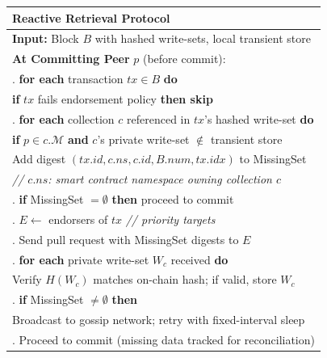 \begin{algorithm}[h]
\centering
\small
\begin{tabular}{|p{}|}
\hline
\textbf{Reactive Retrieval Protocol} \\
\hline
\textbf{Input:} Block $B$ with hashed write-sets, local transient store \\[3pt]
\textbf{At Committing Peer} $p$ (before commit): \\
\quad 1. \textbf{for each} transaction $tx \in B$ \textbf{do} \\
\quad\quad\quad \textbf{if} $tx$ fails endorsement policy \textbf{then skip} \\
\quad 2. \textbf{for each} collection $c$ referenced in $tx$'s hashed write-set \textbf{do} \\
\quad\quad\quad \textbf{if} $p \in c.\mathcal{M}$ \textbf{and} $c$'s private write-set $\notin$ transient store \\
\quad\quad\quad\quad\quad Add digest $(tx.id, c.\mathit{ns}, c.id, B.num, tx.idx)$ to MissingSet \\
\quad\quad\quad\quad\quad \textit{// $c.\mathit{ns}$: smart contract namespace owning collection $c$} \\
\quad 3. \textbf{if} MissingSet $= \emptyset$ \textbf{then} proceed to commit \\
\quad 4. $E \leftarrow$ endorsers of $tx$ \quad\quad\quad \textit{// priority targets} \\
\quad 5. Send pull request with MissingSet digests to $E$ \\
\quad 6. \textbf{for each} private write-set $W_c$ received \textbf{do} \\
\quad\quad\quad Verify $H(W_c)$ matches on-chain hash; if valid, store $W_c$ \\
\quad 7. \textbf{if} MissingSet $\neq \emptyset$ \textbf{then} \\
\quad\quad\quad Broadcast to gossip network; retry with fixed-interval sleep \\
\quad 8. Proceed to commit (missing data tracked for reconciliation) \\
\hline
\end{tabular}
\caption{Reactive retrieval protocol.}
\label{alg:retrieval}
\end{algorithm}
